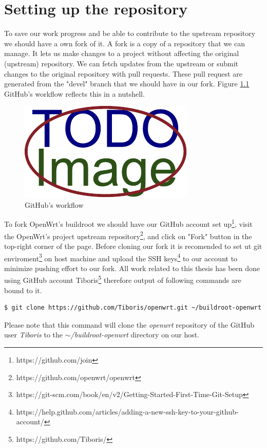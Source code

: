 \chapter{Setting up the repository}\label{set_repo}

To save our work progress and be able to contribute to the upstream repository we should have a own fork of it.
A fork is a copy of a repository that we can manage.
It lets us make changes to a project without affecting the original (upstream) repository.
We can fetch updates from the upstream or submit changes to the original repository with pull requests.
These pull request are generated from the "devel" branch that we should have in our fork.
Figure \ref{fig:git-workflow} GitHub's workflow reflects this in a nutshell.
\begin{figure}[h]
    \centering
    \includegraphics[scale=1]{figures/placeholder.pdf}
    \caption{GitHub's workflow}
    \label{fig:git-workflow}
\end{figure}

To fork OpenWrt's buildroot we should have our GitHub account set up\footnote{https://github.com/join}, visit the OpenWrt's project upstream repository\footnote{https://github.com/openwrt/openwrt}, and click on "Fork" button in the top-right corner of the page.
Before cloning our fork it is recomended to set ut git enviroment\footnote{https://git-scm.com/book/en/v2/Getting-Started-First-Time-Git-Setup} on host machine and upload the SSH keys\footnote{https://help.github.com/articles/adding-a-new-ssh-key-to-your-github-account/} to our account to minimize pushing effort to our fork.
All work related to this thesis has been done using GitHub account Tiboris\footnote{https://github.com/Tiboris/} therefore output of following commands are bound to it.
\begin{lstlisting}[columns=fixed,basicstyle=\ttfamily\footnotesize,basicstyle=\ttfamily\footnotesize,tabsize=4,backgroundcolor=\color{yellow!10}]
$ git clone https://github.com/Tiboris/openwrt.git ~/buildroot-openwrt
\end{lstlisting}
Please note that this command will clone the {\it openwrt} repository of the GitHub user {\it Tiboris} to the {\it $\sim$/buildroot-openwrt} directory on our host.

